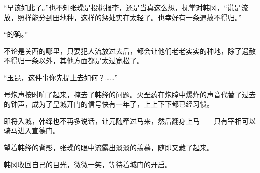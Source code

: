 “早该如此了。”也不知张璪是投桃报李，还是当真这么想，抚掌对韩冈，“说是流放，照样能分到田地种，这样的惩处实在太轻了。也幸好有一条遇赦不得归。”

“的确。”

不论是关西的哪里，只要犯人流放过去后，都会让他们老老实实的种地，除了遇赦不得归一条以外，其他方面都是太过宽松了。

“玉昆，这件事你先提上去如何？……”

号炮声按时响了起来，掩去了韩绛的问题。火垩药在炮膛中爆炸的声音代替了过去的钟声，成为了皇城开门的信号快有一年了，上上下下都已经习惯。

即将入城，韩绛也不再多说话，让元随牵过马来，然后翻身上马——只有宰相可以骑马进入宣德门。

望着韩绛的背影，张璪的眼中流露出淡淡的羡慕，随即又藏了起来。

韩冈收回自己的目光，微微一笑，等待着城门的开启。

